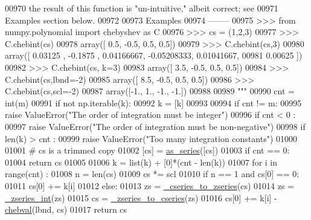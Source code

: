 \begin{DoxyCode}
00970 \textcolor{stringliteral}{    the result of this function is "un-intuitive," albeit correct; see}
00971 \textcolor{stringliteral}{    Examples section below.}
00972 \textcolor{stringliteral}{}
00973 \textcolor{stringliteral}{    Examples}
00974 \textcolor{stringliteral}{    --------}
00975 \textcolor{stringliteral}{    >>> from numpy.polynomial import chebyshev as C}
00976 \textcolor{stringliteral}{    >>> cs = (1,2,3)}
00977 \textcolor{stringliteral}{    >>> C.chebint(cs)}
00978 \textcolor{stringliteral}{    array([ 0.5, -0.5,  0.5,  0.5])}
00979 \textcolor{stringliteral}{    >>> C.chebint(cs,3)}
00980 \textcolor{stringliteral}{    array([ 0.03125   , -0.1875    ,  0.04166667, -0.05208333,  0.01041667,}
00981 \textcolor{stringliteral}{            0.00625   ])}
00982 \textcolor{stringliteral}{    >>> C.chebint(cs, k=3)}
00983 \textcolor{stringliteral}{    array([ 3.5, -0.5,  0.5,  0.5])}
00984 \textcolor{stringliteral}{    >>> C.chebint(cs,lbnd=-2)}
00985 \textcolor{stringliteral}{    array([ 8.5, -0.5,  0.5,  0.5])}
00986 \textcolor{stringliteral}{    >>> C.chebint(cs,scl=-2)}
00987 \textcolor{stringliteral}{    array([-1.,  1., -1., -1.])}
00988 \textcolor{stringliteral}{}
00989 \textcolor{stringliteral}{    """}
00990     cnt = int(m)
00991     \textcolor{keywordflow}{if} \textcolor{keywordflow}{not} np.iterable(k):
00992         k = [k]
00993 
00994     \textcolor{keywordflow}{if} cnt != m:
00995         \textcolor{keywordflow}{raise} ValueError(\textcolor{stringliteral}{"The order of integration must be integer"})
00996     \textcolor{keywordflow}{if} cnt < 0 :
00997         \textcolor{keywordflow}{raise} ValueError(\textcolor{stringliteral}{"The order of integration must be non-negative"})
00998     \textcolor{keywordflow}{if} len(k) > cnt :
00999         \textcolor{keywordflow}{raise} ValueError(\textcolor{stringliteral}{"Too many integration constants"})
01000 
01001     \textcolor{comment}{# cs is a trimmed copy}
01002     [cs] = \hyperlink{namespacepyneb_1_1utils_1_1polyutils_a9c3751d438f0f75922155c7823fe2699}{as\_series}([cs])
01003     \textcolor{keywordflow}{if} cnt == 0:
01004         \textcolor{keywordflow}{return} cs
01005 
01006     k = list(k) + [0]*(cnt - len(k))
01007     \textcolor{keywordflow}{for} i \textcolor{keywordflow}{in} range(cnt) :
01008         n = len(cs)
01009         cs *= scl
01010         \textcolor{keywordflow}{if} n == 1 \textcolor{keywordflow}{and} cs[0] == 0:
01011             cs[0] += k[i]
01012         \textcolor{keywordflow}{else}:
01013             zs = \hyperlink{namespacepyneb_1_1utils_1_1chebyshev_a3340d022485b954c9c722b6eaa456ebb}{\_cseries\_to\_zseries}(cs)
01014             zs = \hyperlink{namespacepyneb_1_1utils_1_1chebyshev_ac55f3063cff69831a2882a7a30b617d7}{\_zseries\_int}(zs)
01015             cs = \hyperlink{namespacepyneb_1_1utils_1_1chebyshev_aa21c9418f1740d12b80ab1563f49ce0b}{\_zseries\_to\_cseries}(zs)
01016             cs[0] += k[i] - \hyperlink{namespacepyneb_1_1utils_1_1chebyshev_a44ae40c5b4cbdc3a230c014c834f5ce6}{chebval}(lbnd, cs)
01017     \textcolor{keywordflow}{return} cs

\end{DoxyCode}

